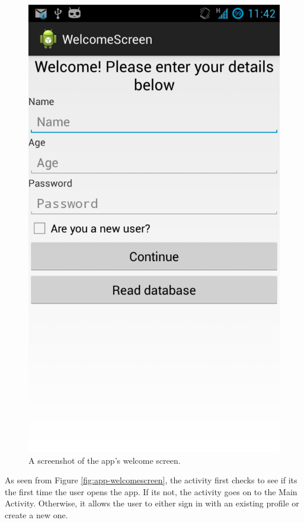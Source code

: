 \begin{figure}[h]
 \centering 
 \includegraphics[clip = true, trim = 0 320 0 60, scale=0.2]{welcome_screen}
 \caption{A screenshot of the app's welcome screen.}
 \label{fig:welcomescreen-screenshot}
\end{figure}

As seen from Figure \ref{fig:app-welcomescreen}, the
activity first checks to see if its the first time the user opens the app. If its not,
the activity goes on to the Main Activity. Otherwise, it allows the user to either sign
in with an existing profile or create a new one.

